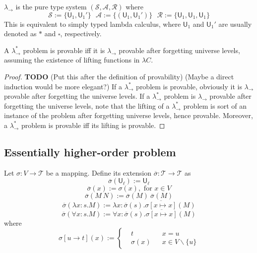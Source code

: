 \begin{definition} $\lambda_\to$ is the pure type system $(\mathcal{S}, \mathcal{A}, \mathcal{R})$ where
  $$\mathcal{S} := \{\mathsf{U}_1, \mathsf{U}_1'\} \ \ \ \mathcal{A} := \{(\mathsf{U}_1, \mathsf{U}_1')\} \ \ \ 
    \mathcal{R} := \{\mathsf{U}_1, \mathsf{U}_1, \mathsf{U}_1\}$$
  This is equivalent to simply typed lambda calculus, where $\mathsf{U}_1$ and $\mathsf{U}_1'$ are
  usually denoted as $*$ and $\square$, respectively.
\end{definition}

\begin{theorem} A $\lambda_\to^*$ problem is provable iff it is $\lambda_\to$ provable after forgetting
  universe levels, assuming the existence of lifting functions in $\lambda C$.
\end{theorem}
\begin{proof} \textbf{TODO}
  (Put this after the definition of provability)
  (Maybe a direct induction would be more elegant?)
  If a $\lambda_\to^*$ problem is provable, obviously it is $\lambda_\to$ provable
  after forgetting the universe levels. If a $\lambda_\to^*$ problem is $\lambda_\to$ provable
  after forgetting the universe levels, note that the lifting of a $\lambda_\to^*$ problem is sort of
  an instance of the problem after forgetting universe levels, hence provable. Moreover,
  a $\lambda_\to^*$ problem is provable iff its lifting is provable.  
\end{proof}

\subsection{Essentially higher-order problem}

\begin{definition} Let $\sigma : V \to \mathcal{T}$ be a mapping.
  Define its extension $\overline{\sigma} : \mathcal{T} \to \mathcal{T}$ as
  $$\overline{\sigma}(\mathsf{U}_\ell) := \mathsf{U}_\ell$$
  $$\overline{\sigma}(x) := \sigma(x), \text{ for }x \in V$$
  $$\overline{\sigma}(M \ N) := \overline{\sigma}(M) \ \overline{\sigma}(M)$$
  $$\overline{\sigma}(\lambda x : s. M) := \lambda x : \overline{\sigma}(s). \overline{\sigma[x \mapsto x]}(M)$$
  $$\overline{\sigma}(\forall x : s. M) := \forall x : \overline{\sigma}(s). \overline{\sigma[x \mapsto x]}(M)$$
  where
  $$\sigma[u \to t](x) := \left\{\begin{aligned}
    & t & & x = u \\
    & \sigma(x) & & x \in V \backslash \{u\}
  \end{aligned}\right.$$
\end{definition}

